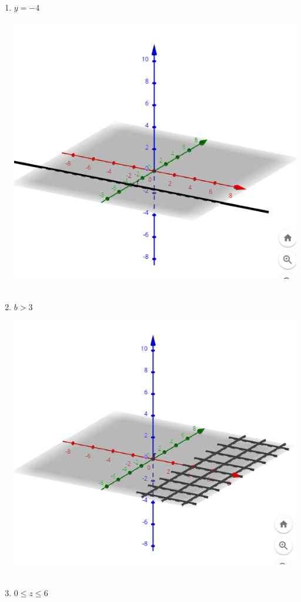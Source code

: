 \documentclass[../practica_01.tex]{subfiles}
\begin{document}
    \begin{enumerate}
        \item $y = -4$

            \includegraphics[scale=0.4]{ej01/resources/1a.png} $ $
        \item $b > 3$

            \includegraphics[scale=0.4]{ej01/resources/1b.png} $ $
        \item $0 \leq z \leq 6$


\end{enumerate}
\end{document}
